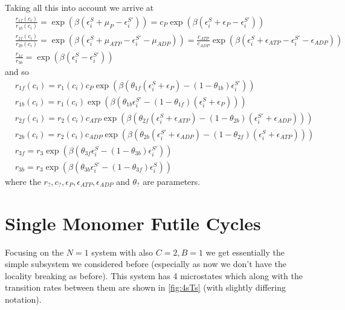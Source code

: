 \documentclass[11pt]{article}
\begin{document}
Taking all this into account we arrive at
\begin{align}
    &\frac{r_{1f}(c_i)}{r_{1b}(c_i)} = \exp(\beta(\epsilon_i^S+\mu_P-\epsilon_i^{S'})) = c_P\exp(\beta(\epsilon_i^S+\epsilon_P-\epsilon_i^{S'})) \label{eq:rp1} \\
    &\frac{r_{2f}(c_i)}{r_{2b}(c_i)} = \exp(\beta(\epsilon_i^S+\mu_{ATP}-\epsilon_i^{S'}-\mu_{ADP})) = \frac{c_{ATP}}{c_{ADP}}\exp(\beta(\epsilon_i^S+\epsilon_{ATP}-\epsilon_i^{S'}-\epsilon_{ADP})) \label{eq:rp2} \\
    &\frac{r_{3f}}{r_{3b}} = \exp(\beta(\epsilon_i^S-\epsilon_i^{S'})) \label{eq:rp3}
\end{align}
and so
\begin{align}
    &r_{1f}(c_i) = r_1(c_i)c_P\exp(\beta(\theta_{1f}(\epsilon_i^S+\epsilon_P)-(1-\theta_{1b})\epsilon_i^{S'})) \label{eq:rate1f} \\
    &r_{1b}(c_i) = r_1(c_i)\exp(\beta(\theta_{1b}\epsilon_i^{S'}-(1-\theta_{1f})(\epsilon_i^S+\epsilon_P))) \label{eq:rate1b} \\
    &r_{2f}(c_i) = r_2(c_i)c_{ATP}\exp(\beta(\theta_{2f}(\epsilon_i^S+\epsilon_{ATP})-(1-\theta_{2b})(\epsilon_i^{S'}+\epsilon_{ADP}))) \label{eq:rate2f} \\
    &r_{2b}(c_i) = r_2(c_i)c_{ADP}\exp(\beta(\theta_{2b}(\epsilon_i^{S'}+\epsilon_{ADP})-(1-\theta_{2f})(\epsilon_i^S+\epsilon_{ATP}))) \label{eq:rate2b} \\
    &r_{3f} = r_3\exp(\beta(\theta_{3f}\epsilon_i^S-(1-\theta_{3b})\epsilon_i^{S'})) \label{eq:rate3f} \\
    &r_{3b} = r_3\exp(\beta(\theta_{3b}\epsilon_i^{S'}-(1-\theta_{3f})\epsilon_i^S)) \label{eq:rate3b}
\end{align}
where the $r_?,c_?,\epsilon_P,\epsilon_{ATP},\epsilon_{ADP}$ and $\theta_?$ are parameters.

\section{Single Monomer Futile Cycles}
Focusing on the $N=1$ system with also $C=2,B=1$ we get essentially the simple subsystem we considered before (especially as now we don't have the locality breaking as before).
This system has 4 microstates which along with the transition rates between them are shown in \cref{fig:4sTs} (with slightly differing notation).
\end{document}
